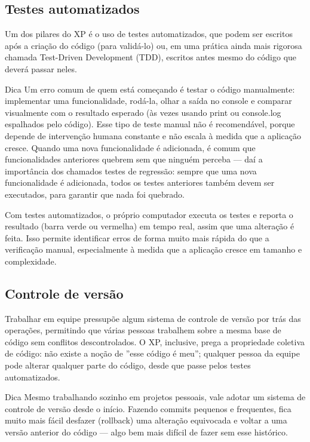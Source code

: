 \subsection{Testes automatizados}

Um dos pilares do XP é o uso de testes automatizados, que podem ser escritos após a criação do código (para validá-lo) ou, em uma prática ainda mais rigorosa chamada Test-Driven Development (TDD), escritos antes mesmo do código que deverá passar neles.

\begin{infobox}{Dica}
Um erro comum de quem está começando é testar o código manualmente: implementar uma funcionalidade, rodá-la, olhar a saída no console e comparar visualmente com o resultado esperado (às vezes usando print ou console.log espalhados pelo código). Esse tipo de teste manual não é recomendável, porque depende de intervenção humana constante e não escala à medida que a aplicação cresce. Quando uma nova funcionalidade é adicionada, é comum que funcionalidades anteriores quebrem sem que ninguém perceba — daí a importância dos chamados testes de regressão: sempre que uma nova funcionalidade é adicionada, todos os testes anteriores também devem ser executados, para garantir que nada foi quebrado.
\end{infobox}

Com testes automatizados, o próprio computador executa os testes e reporta o resultado (barra verde ou vermelha) em tempo real, assim que uma alteração é feita. Isso permite identificar erros de forma muito mais rápida do que a verificação manual, especialmente à medida que a aplicação cresce em tamanho e complexidade.

\subsection{Controle de versão}

Trabalhar em equipe pressupõe algum sistema de controle de versão por trás das operações, permitindo que várias pessoas trabalhem sobre a mesma base de código sem conflitos descontrolados. O XP, inclusive, prega a propriedade coletiva de código: não existe a noção de ”esse código é meu”; qualquer pessoa da equipe pode alterar qualquer parte do código, desde que passe pelos testes automatizados.

\begin{infobox}{Dica}
Mesmo trabalhando sozinho em projetos pessoais, vale adotar um sistema de controle de versão desde o início. Fazendo commits pequenos e frequentes, fica muito mais fácil desfazer (rollback) uma alteração equivocada e voltar a uma versão anterior do código — algo bem mais difícil de fazer sem esse histórico.
\end{infobox}

